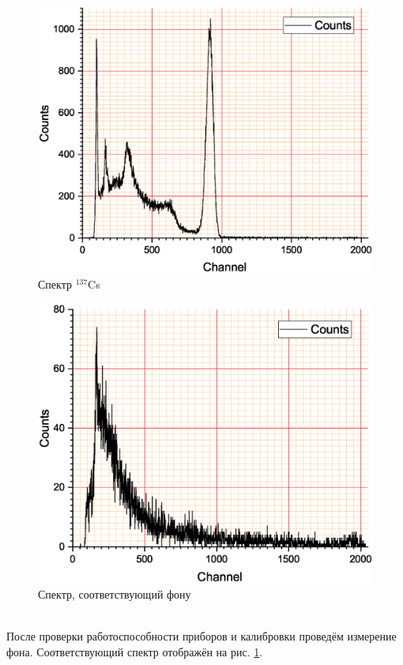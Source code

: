 \documentclass[a4paper]{article}
\begin{document}
\begin{figure}
\begin{center}
\begin{minipage}{0.49\linewidth}
			\includegraphics[width=1\linewidth]{cs.eps}
			\caption{Спектр $^{137}$Cs} %
		\end{minipage}
		\hfill 
	\end{center}
\end{figure}
\begin{figure}
	\centering
	\includegraphics[width=0.49\linewidth]{фон}
	\caption{Спектр, соответствующий фону}
	\label{fig:фон}
\end{figure}

 ~\\
После проверки работоспособности приборов и калибровки проведём измерение фона. Соответствующий спектр отображён на рис. \ref{fig:фон}.
\end{document}
